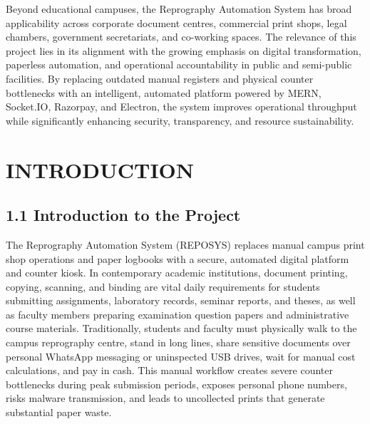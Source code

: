 \documentclass[12pt,a4paper]{report}
\begin{document}
Beyond educational campuses, the Reprography Automation System has broad applicability across corporate document centres, commercial print shops, legal chambers, government secretariats, and co-working spaces. The relevance of this project lies in its alignment with the growing emphasis on digital transformation, paperless automation, and operational accountability in public and semi-public facilities. By replacing outdated manual registers and physical counter bottlenecks with an intelligent, automated platform powered by MERN, Socket.IO, Razorpay, and Electron, the system improves operational throughput while significantly enhancing security, transparency, and resource sustainability.

\newpage
{}
\setcounter{page}{1}
\tableofcontents

\newpage
\listoftables

\newpage
\listoffigures

\newpage
{}
\setcounter{page}{1}

\chapter{INTRODUCTION}

\section{1.1 Introduction to the Project}
The Reprography Automation System (REPOSYS) replaces manual campus print shop operations and paper logbooks with a secure, automated digital platform and counter kiosk. In contemporary academic institutions, document printing, copying, scanning, and binding are vital daily requirements for students submitting assignments, laboratory records, seminar reports, and theses, as well as faculty members preparing examination question papers and administrative course materials. Traditionally, students and faculty must physically walk to the campus reprography centre, stand in long lines, share sensitive documents over personal WhatsApp messaging or uninspected USB drives, wait for manual cost calculations, and pay in cash. This manual workflow creates severe counter bottlenecks during peak submission periods, exposes personal phone numbers, risks malware transmission, and leads to uncollected prints that generate substantial paper waste.
\end{document}
